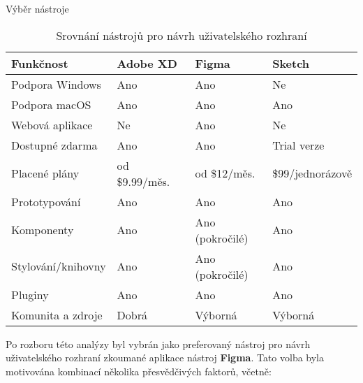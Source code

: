 \begin{subsection}{Výběr nástroje}
    \begin{table}[h]
        \centering
        \caption{Srovnání nástrojů pro návrh uživatelského rozhraní}
        \label{tab:ui-design-tools-comparison}
        \resizebox{\textwidth}{!}
        {
            \begin{tabular}{llll}
                \toprule
                \textbf{Funkčnost} & \textbf{Adobe XD} & \textbf{Figma}  & \textbf{Sketch}  \\
                \midrule
                Podpora Windows    & Ano               & Ano             & Ne               \\
                Podpora macOS      & Ano               & Ano             & Ano              \\
                Webová aplikace    & Ne                & Ano             & Ne               \\
                Dostupné zdarma    & Ano               & Ano             & Trial verze      \\
                Placené plány      & od \$9.99/měs.\    & od \$12/měs.\    & \$99/jednorázově \\
                Prototypování      & Ano               & Ano             & Ano              \\
                Komponenty         & Ano               & Ano (pokročilé) & Ano              \\
                Stylování/knihovny & Ano               & Ano (pokročilé) & Ano              \\
                Pluginy            & Ano               & Ano             & Ano              \\
                Komunita a zdroje  & Dobrá             & Výborná         & Výborná          \\
                \bottomrule
            \end{tabular}
        }
        \source{}
    \end{table}

    Po rozboru této analýzy byl vybrán jako preferovaný nástroj pro návrh uživatelského rozhraní zkoumané aplikace nástroj \textbf{Figma}.
    Tato volba byla motivována kombinací několika přesvědčivých faktorů, včetně:


\end{subsection}
